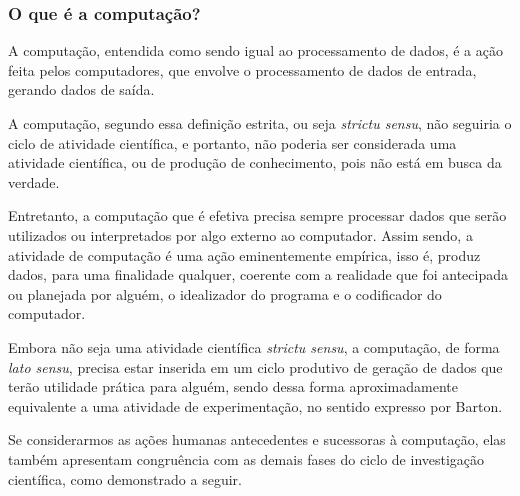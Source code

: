 \subsubsection{O que é a computação?}
A computação, entendida como sendo igual ao processamento de dados, é a ação feita pelos computadores, que envolve o processamento de dados de entrada, gerando dados de saída.

A computação, segundo essa definição estrita, ou seja \textit{strictu sensu}, não seguiria o ciclo de atividade científica, e portanto, não poderia ser considerada uma atividade científica, ou de produção de conhecimento, pois não está em busca da verdade.

Entretanto, a computação que é efetiva precisa sempre processar dados que serão utilizados ou interpretados por algo externo ao computador.
Assim sendo, a atividade de computação é uma ação eminentemente empírica, isso é, produz dados, para uma finalidade qualquer, coerente com a realidade que foi antecipada ou planejada por alguém, o idealizador do programa e o codificador do computador.

Embora não seja uma atividade científica \textit{strictu sensu}, a computação, de forma \textit{lato sensu}, precisa estar inserida em um ciclo produtivo de geração de dados que terão utilidade prática para alguém, sendo dessa forma aproximadamente equivalente a uma atividade de experimentação, no sentido expresso por Barton.

Se considerarmos as ações humanas  antecedentes e sucessoras à computação, elas também apresentam congruência com as demais fases do ciclo de investigação científica, como demonstrado a seguir.

